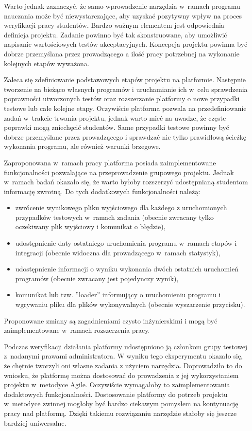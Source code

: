 Warto jednak zaznaczyć, że samo wprowadzenie narzędzia w~ramach programu nauczania może być niewystarczające, aby uzyskać pozytywny wpływ na proces weryfikacji pracy studentów.
Bardzo ważnym elementem jest odpowiednia definicja projektu.
Zadanie powinno być tak skonstruowane, aby umożliwić napisanie wartościowych testów akceptacyjnych.
Koncepcja projektu powinna być dobrze przemyślana przez prowadzącego a ilość pracy potrzebnej na wykonanie kolejnych etapów wyważona.

Zaleca się zdefiniowanie podstawowych etapów projektu na platformie.
Następnie tworzenie na bieżąco własnych programów i uruchamianie ich w~celu sprawdzenia poprawności utworzonych testów oraz rozszerzanie platformy o nowe przypadki testowe lub całe kolejne etapy.
Oczywiście platforma pozwala na przedefiniowanie zadań w~trakcie trwania projektu, jednak warto mieć na uwadze, że częste poprawki mogą zniechęcić studentów.
Same przypadki testowe powinny być dobrze przemyślane przez prowadzącego i sprawdzać nie tylko prawidłową ścieżkę wykonania programu, ale również warunki brzegowe.

Zaproponowana w~ramach pracy platforma posiada zaimplementowane funkcjonalności pozwalające na przeprowadzenie grupowego projektu.
Jednak w~ramach badań okazało się, że warto byłoby rozszerzyć udostępnianą studentom informację zwrotną.
Do tych dodatkowych funkcjonalności należą:
\begin{itemize}
    \item zwrócenie wynikowego pliku wyjściowego dla każdego z uruchomionych przypadków testowych w~ramach zadania (obecnie zwracany tylko oczekiwany plik wyjściowy i komunikat o błędzie),
    \item udostępnienie daty ostatniego uruchomienia programu w~ramach etapów i integracji (obecnie widoczna dla prowadzącego w~ramach statystyk),
    \item udostępnienie informacji o wyniku wykonania dwóch ostatnich uruchomień programów (obecnie zwracany jest pojedynczy wynik),
    \item komunikat lub tzw. ”loader” informujący o uruchomieniu programu i wgrywaniu pliku dla plików wykonywalnych (obecnie wyszarzenie przycisku).
\end{itemize}
Proponowane zmiany są zagadnieniami czysto inżynierskimi i mogą być zaimplementowane w~ramach rozszerzenia pracy.

Podczas weryfikacji działania platformy udostępniono ją członkom grupy testowej z~nadanymi prawami administratora.
W wyniku tego eksperymentu okazało się, że chętnie tworzyli oni własne zadania z użyciem narzędzia.
Doprowadziło to do wniosku, że platformę można dostosować do prowadzenia z jej wykorzystaniem projektu w~metodyce Agile.
Oczywiście wymagałoby to zaimplementowania dodaktowych funkcjonalności.
Dostosowanie platformy do potrzeb projektu w~metodyce zwinnej mogłoby być bardzo ciekawym pomysłem na kontynuację pracy nad platformą.
Dzięki takiemu rozwiązaniu narzędzie stałoby się jeszcze bardziej uniwersalne.






